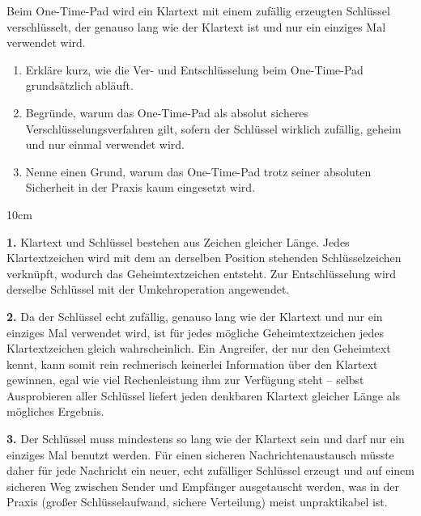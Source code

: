 \question[4]
Beim One-Time-Pad wird ein Klartext mit einem zufällig erzeugten 
Schlüssel verschlüsselt, der genauso lang wie der Klartext ist und nur 
ein einziges Mal verwendet wird.

\begin{enumerate}
    \item Erkläre kurz, wie die Ver- und Entschlüsselung beim 
    One-Time-Pad grundsätzlich abläuft.
    \item Begründe, warum das One-Time-Pad als absolut sicheres 
    Verschlüsselungsverfahren gilt, sofern der Schlüssel wirklich 
    zufällig, geheim und nur einmal verwendet wird.
    \item Nenne einen Grund, warum das One-Time-Pad trotz seiner 
    absoluten Sicherheit in der Praxis kaum eingesetzt wird.
\end{enumerate}

\begin{solutionbox}{10cm}

\textbf{1.} Klartext und Schlüssel bestehen aus Zeichen gleicher Länge. 
Jedes Klartextzeichen wird mit dem an derselben Position stehenden 
Schlüsselzeichen verknüpft, wodurch das Geheimtextzeichen 
entsteht. Zur Entschlüsselung wird derselbe Schlüssel mit der 
Umkehroperation angewendet.

\textbf{2.} Da der Schlüssel echt zufällig, genauso lang wie der 
Klartext und nur ein einziges Mal verwendet wird, ist für jedes 
mögliche Geheimtextzeichen jedes Klartextzeichen gleich wahrscheinlich. 
Ein Angreifer, der nur den Geheimtext kennt, kann somit rein rechnerisch 
keinerlei Information über den Klartext gewinnen, egal wie viel 
Rechenleistung ihm zur Verfügung steht -- selbst Ausprobieren aller 
Schlüssel liefert jeden denkbaren Klartext gleicher Länge als mögliches 
Ergebnis. 

\textbf{3.} Der Schlüssel muss mindestens so lang wie der Klartext sein 
und darf nur ein einziges Mal benutzt werden. Für einen sicheren 
Nachrichtenaustausch müsste daher für jede Nachricht ein neuer, echt 
zufälliger Schlüssel erzeugt und auf einem sicheren Weg zwischen Sender 
und Empfänger ausgetauscht werden, was in der Praxis (großer 
Schlüsselaufwand, sichere Verteilung) meist unpraktikabel ist. 


\end{solutionbox}